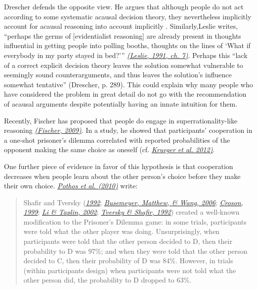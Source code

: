 Drescher defends the opposite view. He
argues that although people do not act according to some systematic
acausal decision theory, they nevertheless implicitly account for
acausal reasoning into account implicitly \parencite{Drescher2006-ky}. Similarly,Leslie
writes, ``perhaps the germs of {[}evidentialist
reasoning{]} are already present in thoughts influential in getting
people into polling booths, thoughts on the lines of `What if everybody in my party stayed in
bed?'''
\href{https://sl4librarian.files.wordpress.com/2016/12/two-bird-deaths-one-throw-leslie.pdf}{\emph{(Leslie,
1991, ch. 7)}}. Perhaps this ``lack of a correct explicit decision theory leaves the solution
somewhat vulnerable to seemingly sound counterarguments, and thus leaves the solution's influence
somewhat tentative'' (Drescher, p. 289). This could explain why many people who have considered the
problem in great detail do not go with the recommendation of acausal arguments despite potentially
having an innate intuition for them.

Recently, Fischer has proposed that people do engage in superrationality-like
reasoning
\href{http://citeseerx.ist.psu.edu/viewdoc/download?doi=10.1.1.408.464\&rep=rep1\&type=pdf}{\emph{(Fischer,
2009)}}. In a study, he showed that participants' cooperation in a one-shot prisoner's dilemma
correlated with reported probabilities of
the opponent making the same choice as oneself (cf.
\href{https://sl4librarian.files.wordpress.com/2017/01/krueger2012-social-projection.pdf}{\emph{Krueger
et al. 2012)}}.

One further piece of evidence in favor of this hypothesis is that
cooperation decreases when people learn about the other person's choice
before they make their own choice.
\href{https://www.researchgate.net/publication/222823221_Understanding_cooperation_in_the_Prisoner\%27s_Dilemma_game}{\emph{Pothos
et al. (2010)}} write:

\begin{quote}
Shafir and Tversky
(\href{http://citeseerx.ist.psu.edu/viewdoc/download?doi=10.1.1.371.8926\&rep=rep1\&type=pdf\#page=720}{\emph{1992}};
\href{http://bacon.umcs.lublin.pl/~lukasik/wp-content/uploads/2010/12/A-Quantum-Information-Processing-p131.pdf}{\emph{Busemeyer,
Matthew, \& Wang, 2006}};
\href{http://citeseerx.ist.psu.edu/viewdoc/download?doi=10.1.1.318.6368\&rep=rep1\&type=pdf}{\emph{Croson,
1999}};
\href{https://www.researchgate.net/publication/285712430_Examining_whether_there_is_a_disjunction_effect_in_prisoner\%27s_dilemma_games}{\emph{Li
\& Taplin, 2002}};
\href{https://www.researchgate.net/publication/240286082_The_Disjunction_Effect_in_Choice_Under_Uncertainty}{\emph{Tversky
\& Shafir, 1992}}) created a well-known modification to the Prisoner's
Dilemma game: in some trials, participants were told what the other
player was doing. Unsurprisingly, when participants were told that the
other person decided to D, then their probability to D was 97\%; and
when they were told that the other person decided to C, then their
probability of D was 84\%. However, in trials (within participants
design) when participants were not told what the other person did, the
probability to D dropped to 63\%.
\end{quote}


